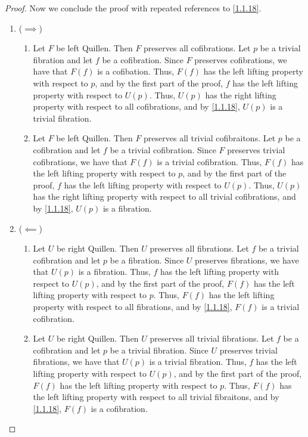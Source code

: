 \begin{proof}
	Now we conclude the proof with repeated references to \cref{1.1.18}.
	\begin{enumerate}
		\item ($\implies $)
			\begin{enumerate}
				\item Let $F$ be left Quillen. Then $F$ preserves all cofibrations. Let $p$ be a trivial fibration and let $f$ be a cofibration. Since $F$ preserves cofibrations, we have that $F(f)$ is a cofibation. Thus, $F(f)$ has the left lifting property with respect to $p$, and by the first part of the proof, $f$ has the left lifting property with respect to $U(p)$. Thus, $U(p)$ has the right lifting property with respect to all cofibrations, and by \cref{1.1.18}, $U(p)$ is a trivial fibration.
				\item Let $F$ be left Quillen. Then $F$ preserves all trivial cofibraitons. Let $p$ be a cofibration and let $f$ be a trivial cofibration. Since $F$ preserves trivial cofibrations, we have that $F(f)$ is a trivial cofibration. Thus, $F(f)$ has the left lifting property with respect to $p$, and by the first part of the proof, $f$ has the left lifting property with respect to $U(p)$. Thus, $U(p)$ has the right lifting property with respect to all trivial cofibrations, and by \cref{1.1.18}, $U(p)$ is a fibration.
			\end{enumerate}
		\item ($\impliedby $)
			\begin{enumerate}
				\item Let $U$ be right Quillen. Then $U$ preserves all fibrations. Let $f$ be a trivial cofibration and let $p$ be a fibration. Since $U$ preserves fibrations, we have that $U(p)$ is a fibration. Thus, $f$ has the left lifting property with respect to $U(p)$, and by the first part of the proof, $F(f)$ has the left lifting property with respect to $p$. Thus, $F(f)$ has the left lifting property with respect to all fibrations, and by \cref{1.1.18}, $F(f)$ is a trivial cofibration.
				\item Let $U$ be right Quillen. Then $U$ preserves all trivial fibrations. Let $f$ be a cofibration and let $p$ be a trivial fibration. Since $U$ preserves trivial fibrations, we have that $U(p)$ is a trivial fibration. Thus, $f$ has the left lifting property with respect to $U(p)$, and by the first part of the proof, $F(f)$ has the left lifting property with respect to $p$. Thus, $F(f)$ has the left lifting property with respect to all trivial fibraitons, and by \cref{1.1.18}, $F(f)$ is a cofibration.
			\end{enumerate}
	\end{enumerate}
\end{proof}

